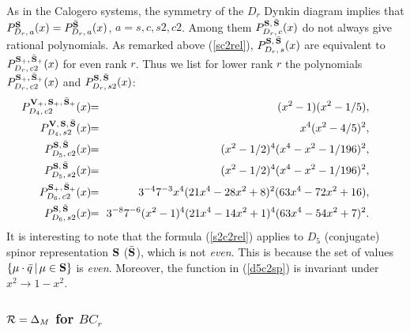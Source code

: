 \documentclass[a4paper,12pt]{article}
\begin{document}
As in the Calogero systems, the symmetry of the $D_r$ Dynkin diagram
implies that $P_{D_{r},\,a}^{\bf S}(x)=P_{D_{r},\,a}^{\bar{\bf S}}(x)$,
$a=s,c,s2,c2$. Among them  $P_{D_{r},\,c}^{{\bf S},\,\bar{\bf S}}(x)$
do not always give rational polynomials. As remarked above (\ref{sc2rel}),
$P_{D_{r},\,s}^{{\bf S},\,\bar{\bf S}}(x)$ are equivalent to
$P_{D_{r},\,c2}^{{\bf S}_+,\,\bar{\bf S}_+}(x)$ for even rank $r$.
Thus we list for lower rank $r$ the polynomials
$P_{D_{r},\,c2}^{{\bf S}_+,\,\bar{\bf S}_+}(x)$ and
$P_{D_{r},\,s2}^{{\bf S},\,\bar{\bf S}}(x)$:
\begin{eqnarray}
   \hspace{-6mm}P_{D_{4},\,c2}^{{\bf V}_+,\,{\bf S}_+,\,\bar{\bf S}_+}(x)
   &\!\!=\!\!& (x^2-1)(x^2-1/5),\\
   \hspace{-6mm}P_{D_{4},\,s2}^{{\bf V},\,{\bf S},\,\bar{\bf S}}(x)&\!\!=\!\!&
   x^4(x^2-4/5)^2,\\
   \hspace{-6mm}P_{D_{5},\,c2}^{{\bf S},\,\bar{\bf S}}(x)&\!\!=\!\!&
   (x^2-1/2)^4(x^4-x^2-1/196)^2,
   \label{d5c2sp}\\
   \hspace{-6mm}P_{D_{5},\,s2}^{{\bf S},\,\bar{\bf S}}(x)&\!\!=\!\!&
   (x^2-1/2)^4(x^4-x^2-1/196)^2,\\
   \hspace{-6mm}P_{D_{6},\,c2}^{{\bf S}_+,\,\bar{\bf S}_+}(x)&\!\!=\!\!&
   3^{-4}7^{-3}x^4(21x^4-28x^2+8)^2(63x^4-72x^2+16),\\
   \hspace{-6mm}P_{D_{6},\,s2}^{{\bf S},\,\bar{\bf S}}(x)&\!\!=\!\!&
   3^{-8}7^{-6}(x^2-1)^4(21x^4-14x^2+1)^4(63x^4-54x^2+7)^2.
\end{eqnarray}
It is interesting to note that the formula (\ref{s2c2rel}) applies to
$D_5$ (conjugate) spinor representation ${\bf S}$ ($\bar{\bf S}$),
which is not {\em even\/}. This is because the set of values
$\{\mu\cdot\bar{q}\,|\,\mu\in{\bf S}\}$ is {\em even\/}. Moreover, the
function in (\ref{d5c2sp}) is invariant under $x^2\to 1-x^2$.

\subsubsection{${\cal R}=\Delta_M$ for $BC_r$}
\label{DMBCr}
\end{document}
